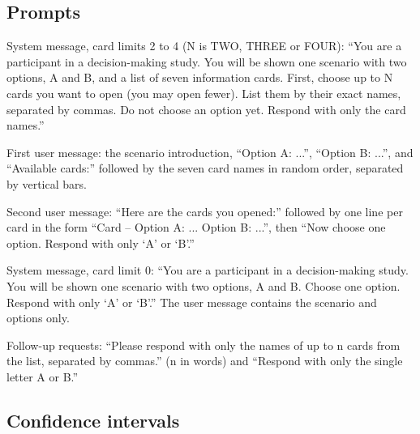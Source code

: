 \documentclass[11pt]{article}
\begin{document}
\subsection{Prompts}

System message, card limits 2 to 4 (N is TWO, THREE or FOUR): ``You are a participant in a decision-making study. You will be shown one scenario with two options, A and B, and a list of seven information cards. First, choose up to N cards you want to open (you may open fewer). List them by their exact names, separated by commas. Do not choose an option yet. Respond with only the card names.''

First user message: the scenario introduction, ``Option A: ...'', ``Option B: ...'', and ``Available cards:'' followed by the seven card names in random order, separated by vertical bars.

Second user message: ``Here are the cards you opened:'' followed by one line per card in the form ``Card -- Option A: ... Option B: ...'', then ``Now choose one option. Respond with only ‘A’ or ‘B’.''

System message, card limit 0: ``You are a participant in a decision-making study. You will be shown one scenario with two options, A and B. Choose one option. Respond with only ‘A’ or ‘B’.'' The user message contains the scenario and options only.

Follow-up requests: ``Please respond with only the names of up to n cards from the list, separated by commas.'' (n in words) and ``Respond with only the single letter A or B.''

\subsection{Confidence intervals}
\end{document}
